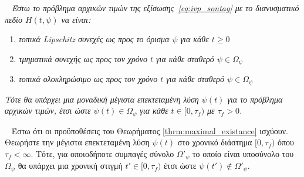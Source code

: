 \begin{theorem}\cite{sontag1998}~
	\textit{Έστω το πρόβλημα αρχικών τιμών της εξίσωσης~\eqref{eq:ivp_sontag} με το διανυσματικό πεδίο $H(t, \psi)$ να είναι:}
	\begin{enumerate}
		\item \textit{τοπικά Lipschitz συνεχές ως προς το όρισμα $\psi$ για κάθε $t \geq 0$}
		
		\item τ\textit{μηματικά συνεχής ως προς τον χρόνο $t$ για κάθε σταθερό $\psi \in \Omega_\psi$}
		
		\item \textit{τοπικά ολοκληρώσιμο ως προς τον χρόνο $t$ για κάθε σταθερό $\psi \in \Omega_\psi$}
	\end{enumerate}
	\textit{Τότε θα υπάρχει μια μοναδική μέγιστα επεκτεταμένη λύση $\psi(t)$ για το πρόβλημα αρχικών τιμών, έτσι ώστε $\psi(t) \in \Omega_\psi$ για κάθε $t \in [0, \tau_f)$ με $\tau_f >0$.}\\
	\label{thrm:maximal_existance} 
\end{theorem}

\begin{proposition}\cite{sontag1998}~
	Έστω ότι οι προϋποθέσεις του Θεωρήματος \ref{thrm:maximal_existance} ισχύουν. Θεωρήστε την μέγιστα επεκτεταμένη λύση $\psi(t)$ στο χρονικό διάστημα $[0,\tau_f)$ όπου $\tau_f < \infty$. Τότε, για οποιοδήποτε συμπαγές σύνολο $\Omega'_\psi $ το οποίο είναι υποσύνολο του $\Omega_\psi$ θα υπάρχει μια χρονική στιγμή $t' \in [0,\tau_f)$ έτσι ώστε $\psi(t') \notin \Omega'_\psi $.
	\label{prop:maximal_subset}
\end{proposition}

